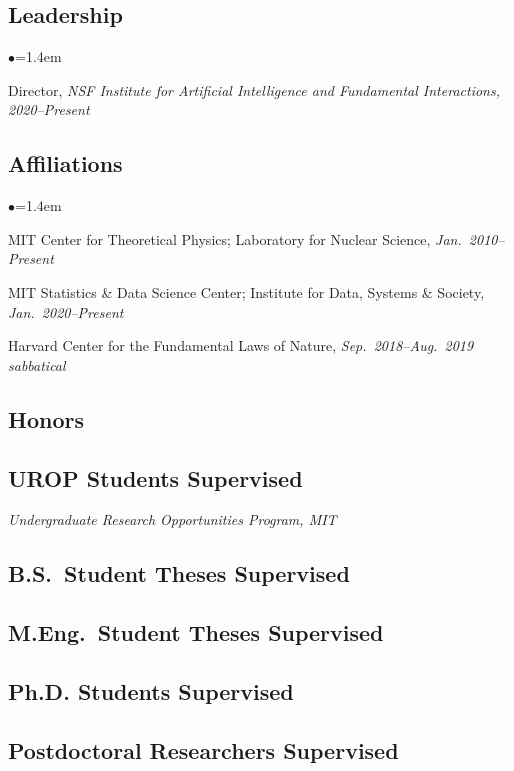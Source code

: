 \documentclass[11pt]{article}
\newcommand{\heading}[1]{\vspace{0in}\subsection*{#1} \vspace{.02in}}
\newcommand{\bbl}{\begin{list}{$\bullet$}{\leftmargin=1.4em \itemsep=-1pt}}
\newcommand{\el}{\end{list}}
\begin{document}

\newpage

\heading{Leadership}

\bbl
\item Director, \textit{NSF Institute for Artificial Intelligence and Fundamental Interactions, 2020--Present}
\el


\heading{Affiliations}

\bbl
\item MIT Center for Theoretical Physics; Laboratory for Nuclear Science, \textit{Jan.~2010--Present}
\item MIT Statistics \& Data Science Center; Institute for Data, Systems \& Society, \textit{Jan.~2020--Present}
\item Harvard Center for the Fundamental Laws of Nature, \textit{Sep.~2018--Aug.~2019 sabbatical}
\el



\heading{Honors}






\heading{UROP Students Supervised}
\vspace{-.1in}
\textit{Undergraduate Research Opportunities Program, MIT}




\heading{B.S.\ Student Theses Supervised}




\heading{M.Eng.\ Student Theses Supervised}




\heading{Ph.D. Students Supervised}




\heading{Postdoctoral Researchers Supervised}
\end{document}
